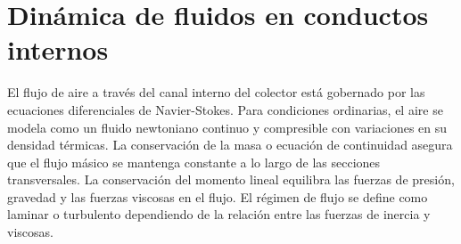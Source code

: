 \section{Dinámica de fluidos en conductos internos}
\label{sec:cap02_dinamica_fluidos}

El flujo de aire a través del canal interno del colector está gobernado por las ecuaciones diferenciales de Navier-Stokes.
Para condiciones ordinarias, el aire se modela como un fluido newtoniano continuo y compresible con variaciones en su densidad térmicas.
La conservación de la masa o ecuación de continuidad asegura que el flujo másico se mantenga constante a lo largo de las secciones transversales.
La conservación del momento lineal equilibra las fuerzas de presión, gravedad y las fuerzas viscosas en el flujo.
El régimen de flujo se define como laminar o turbulento dependiendo de la relación entre las fuerzas de inercia y viscosas.
